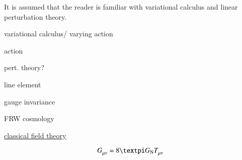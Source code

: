 



It is assumed that the reader is familiar with variational calculus and linear perturbation theory.






\begin{bullets}
    \item variational calculus/ varying action
    \item action
    \item pert. theory?
    \item line element
    \item gauge invariance
    \item FRW cosmology
    \item \underline{classical field theory}
\end{bullets}



\begin{equation}
    G\lo{\mu\nu} = 8\ppi G\ped{N} T\lo{\mu\nu}
\end{equation}

